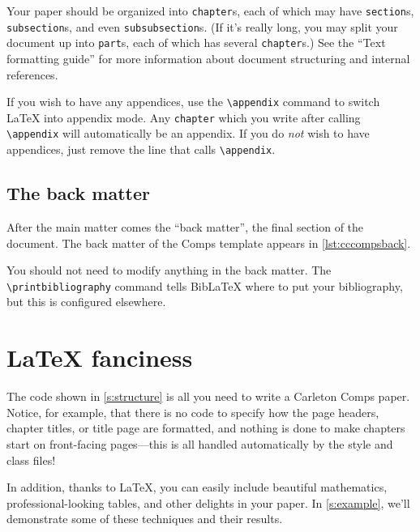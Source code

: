 \documentclass[twoside]{memoir}
\newcommand{\code}[1]{\texttt{#1}}
\begin{document}


Your paper should be organized into \code{chapter}s, each of which may have \code{section}s, \code{subsection}s, and even \code{subsubsection}s.
(If it's really long, you may split your document up into \code{part}s, each of which has several \code{chapter}s.)
See the \enquote{Text formatting guide} for more information about document structuring and internal references.

If you wish to have any appendices, use the \code{\textbackslash{}appendix} command to switch \LaTeX{} into appendix mode.
Any \code{chapter} which you write after calling \code{\textbackslash{}appendix} will automatically be an appendix.
If you do \emph{not} wish to have appendices, just remove the line that calls \code{\textbackslash{}appendix}.

\subsection{The back matter}
\label{s:backmatter}
After the main matter comes the \enquote{back matter}, the final section of the document.
The back matter of the Comps template appears in \cref{lst:cccompsback}.



You should not need to modify anything in the back matter.
The \code{\textbackslash{}printbibliography} command tells Bib\LaTeX{} where to put your bibliography, but this is configured elsewhere.

\section{\LaTeX{} fanciness}
\label{s:fanciness}
The code shown in \cref{s:structure} is all you need to write a Carleton Comps paper.
Notice, for example, that there is no code to specify how the page headers, chapter titles, or title page are formatted, and nothing is done to make chapters start on front-facing pages---this is all handled automatically by the style and class files!

In addition, thanks to \LaTeX{}, you can easily include beautiful mathematics, professional-looking tables, and other delights in your paper.
In \cref{s:example}, we'll demonstrate some of these techniques and their results.
\end{document}
